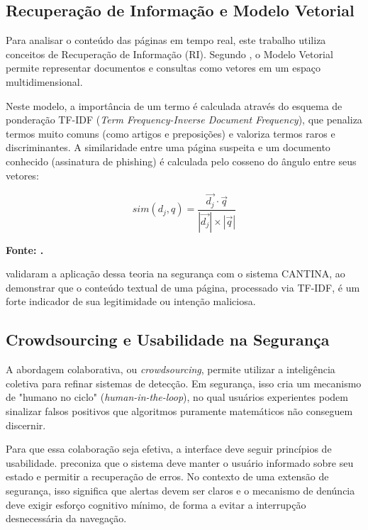 \documentclass[a4paper,12pt]{article}
\begin{document}
\subsection{Recuperação de Informação e Modelo Vetorial}

Para analisar o conteúdo das páginas em tempo real, este trabalho utiliza conceitos de Recuperação de Informação (RI). Segundo , o Modelo Vetorial permite representar documentos e consultas como vetores em um espaço multidimensional.

Neste modelo, a importância de um termo é calculada através do esquema de ponderação TF-IDF (\textit{Term Frequency-Inverse Document Frequency}), que penaliza termos muito comuns (como artigos e preposições) e valoriza termos raros e discriminantes. A similaridade entre uma página suspeita e um documento conhecido (assinatura de phishing) é calculada pelo cosseno do ângulo entre seus vetores:

\begin{equation}
sim(d_j, q) = \frac{\vec{d_j} \cdot \vec{q}}{|\vec{d_j}| \times |\vec{q}|}
\end{equation}
\begin{center}
\textbf{\footnotesize Fonte: .}
\end{center}

 validaram a aplicação dessa teoria na segurança com o sistema CANTINA, ao demonstrar que o conteúdo textual de uma página, processado via TF-IDF, é um forte indicador de sua legitimidade ou intenção maliciosa.

\subsection{Crowdsourcing e Usabilidade na Segurança}

A abordagem colaborativa, ou \textit{crowdsourcing}, permite utilizar a inteligência coletiva para refinar sistemas de detecção. Em segurança, isso cria um mecanismo de "humano no ciclo" (\textit{human-in-the-loop}), no qual usuários experientes podem sinalizar falsos positivos que algoritmos puramente matemáticos não conseguem discernir.

Para que essa colaboração seja efetiva, a interface deve seguir princípios de usabilidade.  preconiza que o sistema deve manter o usuário informado sobre seu estado e permitir a recuperação de erros. No contexto de uma extensão de segurança, isso significa que alertas devem ser claros e o mecanismo de denúncia deve exigir esforço cognitivo mínimo, de forma a evitar a interrupção desnecessária da navegação.
\end{document}
